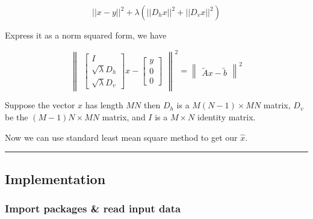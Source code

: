 \documentclass[11pt]{article}
\begin{document}
\[ ||x - y||^2 + \lambda (||D_{h}x||^{2} + ||D_{v}x||^{2}) \]

Express it as a norm squared form, we have

\[
\begin{Vmatrix}
\begin{bmatrix} I \\ \sqrt{\lambda}D_{h}\\ \sqrt{\lambda}D_{v} \end{bmatrix}x -
\begin{bmatrix} y \\ 0 \\ 0 \end{bmatrix}
\end{Vmatrix}^{2}
=
\begin{Vmatrix}\tilde{A}x - \tilde{b} \end{Vmatrix}^{2}
\]

Suppose the vector \(x\) has length \(MN\) then \(D_{h}\) is a
\(M(N-1) \times MN\) matrix, \(D_{v}\) be the \((M-1)N \times MN\)
matrix, and \(I\) is a \(M \times N\) identity matrix.

Now we can use standard least mean square method to get our \(\hat{x}\).

\begin{center}\rule{0.5\linewidth}{\linethickness}\end{center}

    \subsection{Implementation}\label{implementation}

\subsubsection{Import packages \& read input
data}\label{import-packages-read-input-data}
\end{document}
